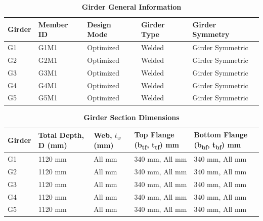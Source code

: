 \documentclass[12pt,a4paper]{report}
\numberwithin{table}{chapter}
\numberwithin{figure}{chapter}
\begin{document}
\newpage

\vspace{0.4em}
\noindent
            
\vspace{4pt}
\begin{longtable}{|L{2.2cm}|L{1.8cm}|p{3.8cm}|p{3.8cm}|p{3.8cm}|}
\caption{\textbf{Girder General Information}}
\hline
\textbf{Girder} & \textbf{Member ID} & \textbf{Design Mode} & \textbf{Girder Type} & \textbf{Girder Symmetry} \\[6pt]
\hline
G1 & G1M1 & Optimized & Welded & Girder Symmetric \\[8pt]
\hline
G2 & G2M1 & Optimized & Welded & Girder Symmetric \\[8pt]
\hline
G3 & G3M1 & Optimized & Welded & Girder Symmetric \\[8pt]
\hline
G4 & G4M1 & Optimized & Welded & Girder Symmetric \\[8pt]
\hline
G5 & G5M1 & Optimized & Welded & Girder Symmetric \\[8pt]
\hline
\end{longtable}

\vspace{0.6em}

\vspace{4pt}
\begin{longtable}{|L{1.8cm}|L{2.3cm}|L{1.8cm}|p{4.8cm}|p{4.8cm}|}
\caption{\textbf{Girder Section Dimensions}}
\hline
\textbf{Girder} & \textbf{Total Depth, D (mm)} & \textbf{Web, $t_w$ (mm)} & \textbf{Top Flange (b\textsubscript{tf}, t\textsubscript{tf}) mm} & \textbf{Bottom Flange (b\textsubscript{bf}, t\textsubscript{bf}) mm} \\[6pt]
\hline
G1 & 1120 mm & All mm & 340 mm, All mm & 340 mm, All mm \\[8pt]
\hline
G2 & 1120 mm & All mm & 340 mm, All mm & 340 mm, All mm \\[8pt]
\hline
G3 & 1120 mm & All mm & 340 mm, All mm & 340 mm, All mm \\[8pt]
\hline
G4 & 1120 mm & All mm & 340 mm, All mm & 340 mm, All mm \\[8pt]
\hline
G5 & 1120 mm & All mm & 340 mm, All mm & 340 mm, All mm \\[8pt]
\hline
\end{longtable}

\vspace{0.6em}
\end{document}
